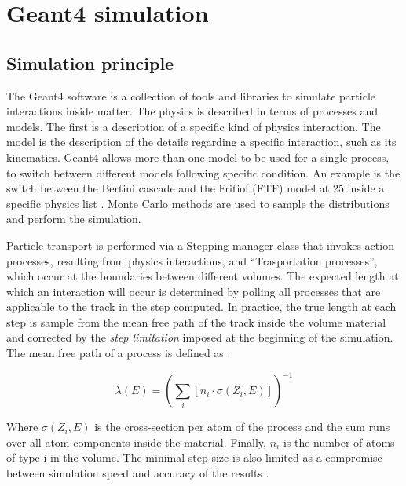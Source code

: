 
\newcommand{\appdirc}{appendices/plots/appendixC}

\chapter{Geant4 simulation}

\label{AppendixC}

\section{Simulation principle}
\label{appC:sec:simulation-principle}

The Geant4 software \cite{AGOSTINELLI2003250} is a collection of tools and libraries to simulate particle interactions inside matter. The physics is described in terms of processes and models. The first is a description of a specific kind of physics interaction. The model is the description of the details regarding a specific interaction, such as its kinematics. Geant4 allows more than one model to be used for a single process, to switch between different models following specific condition. An example is the switch between the Bertini cascade \cite{Heikkinen:2003sc} and the Fritiof (FTF) model at 25 \gev inside a specific physics list \cite{Uzhinsky:2013hea}. Monte Carlo methods are used to sample the distributions and perform the simulation.

Particle transport is performed via a Stepping manager class that invokes action processes, resulting from physics interactions, and ``Trasportation processes'', which occur at the boundaries between different volumes. The expected length at which an interaction will occur is determined by polling all processes that are applicable to the track in the step computed. In practice, the true length at each step is sample from the mean free path of the track inside the volume material and corrected by the \textit{step limitation} imposed at the beginning of the simulation. The mean free path of a process is defined as \cite{AGOSTINELLI2003250}:

\begin{equation}
  \label{eq:mfp-g4}
  \lambda(E) = \left( \sum_i [ n_i \cdot \sigma(Z_i,E)] \right)^{-1}
\end{equation}

Where $\sigma(Z_i,E)$ is the cross-section per atom of the process and the sum runs over all atom components inside the material. Finally, $n_i$  is the number of atoms of type i in the volume. The minimal step size is also limited as a compromise between simulation speed and accuracy of the results \cite{geant4-phys-guide}.

